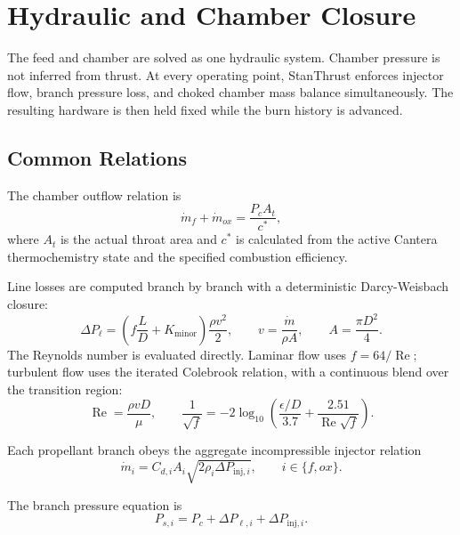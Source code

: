 \documentclass[11pt]{article}
\newcommand{\Rey}{\operatorname{Re}}
\begin{document}
\section{Hydraulic and Chamber Closure}
The feed and chamber are solved as one hydraulic system. Chamber pressure is not inferred from thrust. At every operating point, StanThrust enforces injector flow, branch pressure loss, and choked chamber mass balance simultaneously. The resulting hardware is then held fixed while the burn history is advanced.

\subsection{Common Relations}
The chamber outflow relation is
\begin{equation}
\dot{m}_f+\dot{m}_{ox}=\frac{P_c A_t}{c^*},
\label{eq:feed-mass-flow-split}
\end{equation}
where $A_t$ is the actual throat area and $c^*$ is calculated from the active Cantera thermochemistry state and the specified combustion efficiency.

Line losses are computed branch by branch with a deterministic Darcy-Weisbach closure:
\begin{equation}
\Delta P_{\ell}
=
\left(
f\frac{L}{D}+K_{\text{minor}}
\right)
\frac{\rho v^2}{2},
\qquad
v=\frac{\dot{m}}{\rho A},
\qquad
A=\frac{\pi D^2}{4}.
\label{eq:feed-darcy}
\end{equation}
The Reynolds number is evaluated directly. Laminar flow uses $f=64/\Rey$; turbulent flow uses the iterated Colebrook relation, with a continuous blend over the transition region:
\begin{equation}
\Rey=\frac{\rho v D}{\mu},
\qquad
\frac{1}{\sqrt{f}}
=-2\log_{10}\!\left(\frac{\epsilon/D}{3.7}+\frac{2.51}{\Rey\sqrt{f}}\right).
\label{eq:feed-reynolds}
\end{equation}

Each propellant branch obeys the aggregate incompressible injector relation
\begin{equation}
\dot{m}_i=C_{d,i}A_i\sqrt{2\rho_i\Delta P_{\text{inj},i}},
\qquad i\in\{f,ox\}.
\label{eq:feed-injector-drop}
\end{equation}

The branch pressure equation is
\begin{equation}
P_{s,i}=P_c+\Delta P_{\ell,i}+\Delta P_{\text{inj},i}.
\label{eq:feed-required-pressure}
\end{equation}
\end{document}
